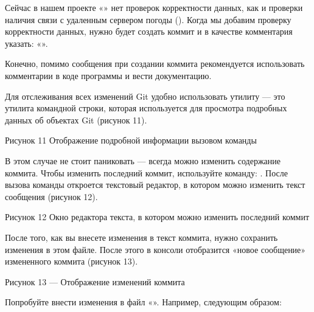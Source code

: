 \documentclass[letterpaper,10pt,russian]{sphinxmanual}
\begin{document}
\sphinxAtStartPar
Сейчас в нашем проекте «» нет проверок корректности данных, как и проверки наличия связи с удаленным сервером погоды (). Когда мы добавим проверку корректности данных, нужно будет создать коммит и в качестве комментария указать:
«».

\sphinxAtStartPar
Конечно, помимо сообщения при создании коммита рекомендуется использовать комментарии в коде программы и вести документацию.

\sphinxAtStartPar
Для отслеживания всех изменений Git удобно использовать утилиту  — это утилита командной строки, которая используется для просмотра подробных данных об объектах Git (рисунок 11).

\sphinxAtStartPar
{}

\sphinxAtStartPar
Рисунок 11 \textendash{} Отображение подробной информации вызовом команды 

\sphinxAtStartPar
{}
В этом случае не стоит паниковать — всегда можно изменить содержание коммита. Чтобы изменить последний коммит, используйте команду: . После вызова команды откроется текстовый редактор, в котором можно изменить текст сообщения (рисунок 12).

\sphinxAtStartPar
{}

\sphinxAtStartPar
Рисунок 12 \textendash{} Окно редактора текста, в котором можно изменить последний коммит

\sphinxAtStartPar
После того, как вы внесете изменения в текст коммита, нужно сохранить изменения в этом файле. После этого в консоли отобразится «новое сообщение» измененного коммита (рисунок 13).

\sphinxAtStartPar
{}
Рисунок 13 — Отображение изменений коммита

\sphinxAtStartPar
Попробуйте внести изменения в файл «». Например, следующим образом:
\end{document}
